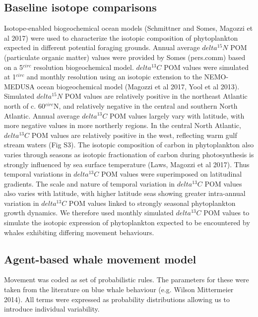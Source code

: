 \documentclass[a4paper,12pt]{article}
\begin{document}
\subsection{Baseline isotope comparisons}
Isotope-enabled biogeochemical ocean models (Schmittner and Somes, Magozzi et al 2017) were used to characterize the isotopic composition of phytoplankton expected in different potential foraging grounds. Annual average $delta^15N$ POM (particulate organic matter) values were provided by Somes (pers.comm) based on a 5$^{circ}$ resolution biogeochemical model. $delta^13C$ POM values were simulated at 1$^{circ}$ and monthly resolution using an isotopic extension to the NEMO-MEDUSA ocean biogeochemical model (Magozzi et al 2017, Yool et al 2013). 
Simulated  $delta^15N$ POM values are relatively positive in the northeast Atlantic north of c. 60$^{circ}$N, and relatively negative in the central and southern North Atlantic. Annual average $delta^13C$ POM values largely vary with latitude, with more negative values in more northerly regions. In the central North Atlantic, $delta^13C$ POM values are relatively positive in the west, reflecting warm gulf stream waters (Fig S3). 
The isotopic composition of carbon in phytoplankton also varies through seasons as isotopic fractionation of carbon during photosynthesis is strongly influenced by sea surface temperature (Laws, Magozzi et al 2017). 
Thus temporal variations in $delta^13C$ POM values were superimposed on latitudinal gradients. 
The scale and nature of temporal variation in $delta^13C$ POM values also varies with latitude, with higher latitude seas showing greater intra-annual variation in $delta^13C$ POM values linked to strongly seasonal phytoplankton growth dynamics. 
We therefore used monthly simulated $delta^13C$ POM values to simulate the isotopic expression of phytoplankton expected to be encountered by whales exhibiting differing movement behaviours.
 
\subsection{Agent-based whale movement model}
Movement was coded as set of probabilistic rules. 
The parameters for these were taken from the literature on blue whale behaviour (e.g. Wilson  Mittermeier 2014). 
All terms were expressed as probability distributions allowing us to introduce individual variability. 
 
\end{document}
